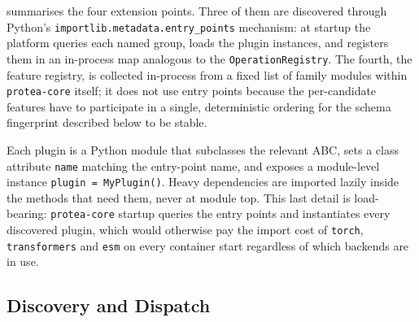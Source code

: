  summarises the four extension points. Three of
them are discovered through Python's \texttt{importlib.metadata.entry\_points}
mechanism: at startup the platform queries each named group, loads the
plugin instances, and registers them in an in-process map analogous to the
\texttt{OperationRegistry}. The fourth, the feature registry, is collected
in-process from a fixed list of family modules within \texttt{protea-core}
itself; it does not use entry points because the per-candidate features
have to participate in a single, deterministic ordering for the schema
fingerprint described below to be stable.

\begin{table}[htbp]
  \centering
  \caption{The four plugin extension points of PROTEA.}
  \label{tab:plugin-layers}
\end{table}

Each plugin is a Python module that subclasses the relevant ABC, sets a
class attribute \texttt{name} matching the entry-point name, and exposes a
module-level instance \texttt{plugin = MyPlugin()}. Heavy dependencies are
imported lazily inside the methods that need them, never at module top.
This last detail is load-bearing: \texttt{protea-core} startup queries the
entry points and instantiates every discovered plugin, which would
otherwise pay the import cost of \texttt{torch}, \texttt{transformers} and
\texttt{esm} on every container start regardless of which backends are in
use.

\subsection{Discovery and Dispatch}
\label{subsec:plugin-dispatch}

